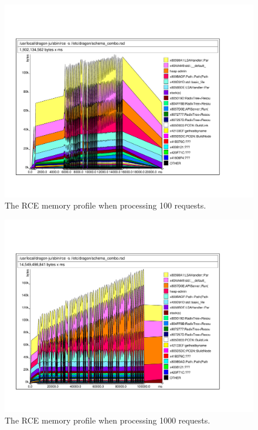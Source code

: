 \documentclass[10pt,a4paper]{report}
\begin{document}
\begin{figure}[!htbp]
  \begin{center}
    \includegraphics[angle=270,scale=0.70]{img/multi-100}
    \caption[RCE memory profile (100 requests)]{The RCE memory profile
      when processing 100 requests.}
    \label{fig:multi-100}
  \end{center}
\end{figure}

\begin{figure}[!htbp]
  \begin{center}
    \includegraphics[angle=270,scale=0.70]{img/multi-1000}
    \caption[RCE memory profile (1000 requests)]{The RCE memory profile
      when processing 1000 requests.}
    \label{fig:multi-1000}
  \end{center}
\end{figure}
\end{document}
